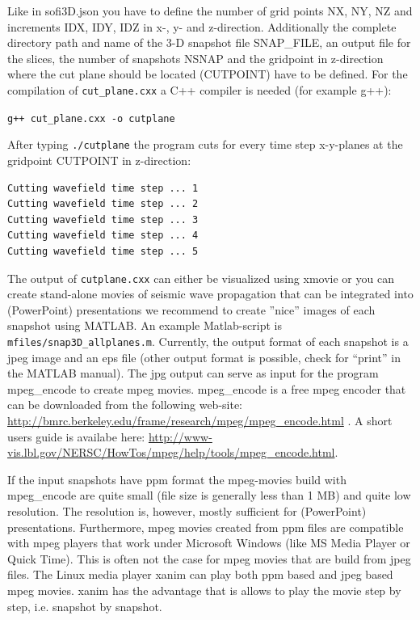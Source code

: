 \documentclass[11pt,onecolumn,oneside]{article}
\begin{document}
Like in sofi3D.json you have to define the number of grid points NX, NY, NZ and increments IDX, IDY, IDZ in x-, y- and z-direction. Additionally the complete directory path and 
name of the 3-D snapshot file SNAP\_FILE, an output file for the slices, the number of snapshots NSNAP and the gridpoint in z-direction where the cut plane should be located 
(CUTPOINT) have to be defined.
For the compilation of  \lstinline{cut_plane.cxx} a C++ compiler is needed (for example g++):   

 \lstinline{g++ cut_plane.cxx -o cutplane }

After typing  \lstinline{./cutplane} the program cuts for every time step x-y-planes at the gridpoint CUTPOINT in z-direction:
\begin{verbatim}
Cutting wavefield time step ... 1
Cutting wavefield time step ... 2
Cutting wavefield time step ... 3
Cutting wavefield time step ... 4
Cutting wavefield time step ... 5
\end{verbatim}

The output of  \lstinline{cutplane.cxx} can either be visualized using xmovie or you can create stand-alone movies of seismic wave propagation that can be integrated into (PowerPoint) presentations we recommend to create ''nice'' images of each snapshot using MATLAB. An example Matlab-script is  \lstinline{mfiles/snap3D_allplanes.m}. Currently, the output format of each snapshot is a jpeg image and an eps file (other output format is possible, check for ``print'' in the MATLAB manual). The jpg output can serve as input for the program mpeg\_encode to create mpeg movies. mpeg\_encode is a free mpeg encoder that can be downloaded from the following web-site: \url{http://bmrc.berkeley.edu/frame/research/mpeg/mpeg_encode.html} . A short users guide is availabe here: \url{http://www-vis.lbl.gov/NERSC/HowTos/mpeg/help/tools/mpeg_encode.html}.

If the input snapshots have ppm format the mpeg-movies build with mpeg\_encode are quite small (file size is generally less than 1 MB) and quite low resolution. The resolution is, however, mostly
sufficient for (PowerPoint) presentations. Furthermore, mpeg movies created from ppm files are compatible with mpeg players that work under Microsoft Windows (like MS Media Player or Quick Time). This
is often not the case for mpeg movies that are build from jpeg files. The Linux media player xanim can play both ppm based and jpeg based mpeg movies. xanim has the advantage that is allows
to play the movie step by step, i.e. snapshot by snapshot.
\end{document}
